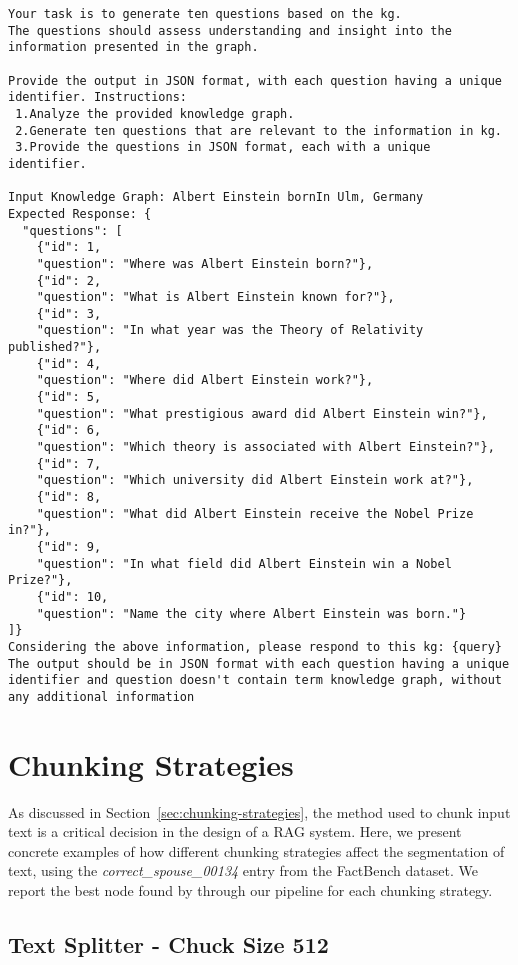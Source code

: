 \begin{appendices}
\begin{Verbatim}[fontsize=\small, frame=single, label={Prompt template for generating 10 questions for each triple}]
Your task is to generate ten questions based on the kg.
The questions should assess understanding and insight into the
information presented in the graph.

Provide the output in JSON format, with each question having a unique
identifier. Instructions:
 1.Analyze the provided knowledge graph.
 2.Generate ten questions that are relevant to the information in kg.
 3.Provide the questions in JSON format, each with a unique identifier.

Input Knowledge Graph: Albert Einstein bornIn Ulm, Germany
Expected Response: {
  "questions": [
    {"id": 1,
    "question": "Where was Albert Einstein born?"},
    {"id": 2,
    "question": "What is Albert Einstein known for?"},
    {"id": 3,
    "question": "In what year was the Theory of Relativity published?"},
    {"id": 4,
    "question": "Where did Albert Einstein work?"},
    {"id": 5,
    "question": "What prestigious award did Albert Einstein win?"},
    {"id": 6,
    "question": "Which theory is associated with Albert Einstein?"},
    {"id": 7,
    "question": "Which university did Albert Einstein work at?"},
    {"id": 8,
    "question": "What did Albert Einstein receive the Nobel Prize in?"},
    {"id": 9,
    "question": "In what field did Albert Einstein win a Nobel Prize?"},
    {"id": 10,
    "question": "Name the city where Albert Einstein was born."}
]}
Considering the above information, please respond to this kg: {query}
The output should be in JSON format with each question having a unique
identifier and question doesn't contain term knowledge graph, without
any additional information
    \end{Verbatim}

\chapter{Chunking Strategies}\label{ch:chunking}
    As discussed in Section~\ref{sec:chunking-strategies}, the method used to chunk input text is a critical decision in the design of a \ac{RAG} system.
    Here, we present concrete examples of how different chunking strategies affect the segmentation of text, using the \textit{correct\_spouse\_00134} entry from the FactBench dataset.
    We report the best node found by through our pipeline for each chunking strategy.
    \section{Text Splitter - Chuck Size 512}\label{sec:chunking:text-splitter}


\end{appendices}
